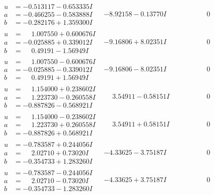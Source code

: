 \documentclass[1p]{elsarticle_modified}
\theoremstyle{definition}
\begin{document}
$$\begin{array}{c|c|c}
\begin{aligned}
u &= -0.513117 - 0.653335 I \\
a &= -0.466255 - 0.583888 I \\
b &= -0.282176 + 1.359300 I\end{aligned}
 & -8.92158 - 0.13770 I & \phantom{-0.000000 } 0 \\ \hline\begin{aligned}
u &= \phantom{-}1.007550 + 0.600676 I \\
a &= -0.025885 + 0.339012 I \\
b &= \phantom{-}0.49191 - 1.56949 I\end{aligned}
 & -9.16806 + 8.02351 I & \phantom{-0.000000 } 0 \\ \hline\begin{aligned}
u &= \phantom{-}1.007550 - 0.600676 I \\
a &= -0.025885 - 0.339012 I \\
b &= \phantom{-}0.49191 + 1.56949 I\end{aligned}
 & -9.16806 - 8.02351 I & \phantom{-0.000000 } 0 \\ \hline\begin{aligned}
u &= \phantom{-}1.154000 + 0.238602 I \\
a &= \phantom{-}1.223730 - 0.260558 I \\
b &= -0.887826 - 0.568921 I\end{aligned}
 & \phantom{-}3.54911 - 0.58151 I & \phantom{-0.000000 } 0 \\ \hline\begin{aligned}
u &= \phantom{-}1.154000 - 0.238602 I \\
a &= \phantom{-}1.223730 + 0.260558 I \\
b &= -0.887826 + 0.568921 I\end{aligned}
 & \phantom{-}3.54911 + 0.58151 I & \phantom{-0.000000 } 0 \\ \hline\begin{aligned}
u &= -0.783587 + 0.244056 I \\
a &= \phantom{-}2.02710 + 0.73020 I \\
b &= -0.354733 + 1.283260 I\end{aligned}
 & -4.33625 - 3.75187 I & \phantom{-0.000000 } 0 \\ \hline\begin{aligned}
u &= -0.783587 - 0.244056 I \\
a &= \phantom{-}2.02710 - 0.73020 I \\
b &= -0.354733 - 1.283260 I\end{aligned}
 & -4.33625 + 3.75187 I & \phantom{-0.000000 } 0\\

\end{array}$$
\end{document}
